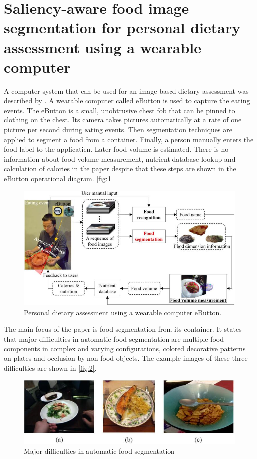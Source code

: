 \section{Saliency-aware food image segmentation for personal dietary assessment using a wearable computer}
A computer system that can be used for an image-based dietary assessment was described by \cite{chen2015saliency}. A wearable computer called eButton is used to capture the eating events. The eButton is a small, unobtrusive chest fob that can be pinned to clothing on the chest. Its camera takes pictures automatically at a rate of one picture per second during eating events. Then segmentation techniques are applied to segment a food from a container. Finally, a person manually enters the food label to the application. Later food volume is estimated. There is no information about food volume measurement, nutrient database lookup and calculation of calories in the paper despite that these steps are shown in the eButton operational diagram. \autoref{fig:1}
\begin{figure}[ht]
\includegraphics{Figures/segm_01.jpg}
\caption{Personal dietary assessment using a wearable computer eButton. }
\label{fig:1}
\end{figure}

The main focus of the paper is food segmentation from its container. It states that major difficulties in automatic food segmentation are multiple food components in complex and varying configurations, colored decorative patterns on plates and occlusion by non-food objects. The example images of these three difficulties are shown in  \autoref{fig:2}.

\begin{figure}[ht]
\includegraphics{Figures/segm_02.jpg}
\caption{Major difficulties in automatic food segmentation }
\label{fig:2}
\end{figure}

